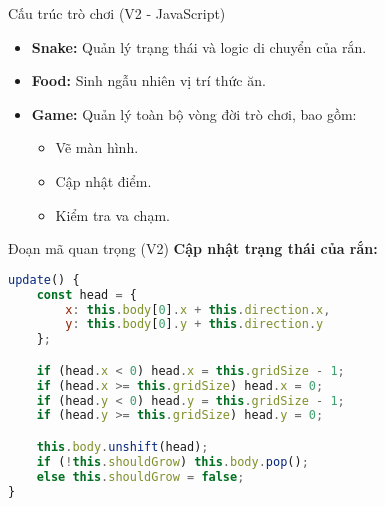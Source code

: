 \documentclass{beamer}
\begin{document}
\begin{frame}{Cấu trúc trò chơi (V2 - JavaScript)}
    \begin{itemize}
        \item \textbf{Snake:} Quản lý trạng thái và logic di chuyển của rắn.
        \item \textbf{Food:} Sinh ngẫu nhiên vị trí thức ăn.
        \item \textbf{Game:} Quản lý toàn bộ vòng đời trò chơi, bao gồm:
        \begin{itemize}
            \item Vẽ màn hình.
            \item Cập nhật điểm.
            \item Kiểm tra va chạm.
        \end{itemize}
    \end{itemize}
\end{frame}

\begin{frame}[fragile]{Đoạn mã quan trọng (V2)}
    \textbf{Cập nhật trạng thái của rắn:}
    \begin{lstlisting}[language=JavaScript]
update() {
    const head = {
        x: this.body[0].x + this.direction.x,
        y: this.body[0].y + this.direction.y
    };

    if (head.x < 0) head.x = this.gridSize - 1;
    if (head.x >= this.gridSize) head.x = 0;
    if (head.y < 0) head.y = this.gridSize - 1;
    if (head.y >= this.gridSize) head.y = 0;

    this.body.unshift(head);
    if (!this.shouldGrow) this.body.pop();
    else this.shouldGrow = false;
}
    \end{lstlisting}
\end{frame}

\end{document}

